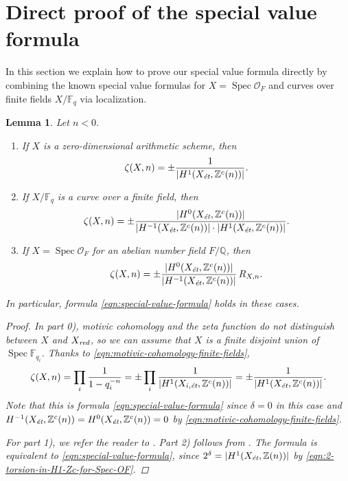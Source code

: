 \documentclass{article}
\DeclareMathOperator{\Spec}{Spec}
\newcommand{\FF}{\mathbb{F}}
\newcommand{\QQ}{\mathbb{Q}}
\newcommand{\ZZ}{\mathbb{Z}}
\newcommand{\et}{\text{\it \'{e}t}}
\newcommand{\red}{\text{\it red}}
\theoremstyle{myplain}
\newtheorem{lemma}[theorem]{Lemma}
\theoremstyle{mydefinition}
\begin{document}

\section{Direct proof of the special value formula}
\label{sec:direct-proof}

In this section we explain how to prove our special value formula directly by
combining the known special value formulas for $X = \Spec \mathcal{O}_F$ and
curves over finite fields $X/\FF_q$ via localization.

\begin{lemma}
  \label{lemma:elementary-proof-1}
  Let $n < 0$.

  \begin{enumerate}
  \item[0)] If $X$ is a zero-dimensional arithmetic scheme, then
    $$\zeta (X,n) = \pm \frac{1}{|H^1 (X_\et, \ZZ^c (n))|}.$$

  \item[1)] If $X/\FF_q$ is a curve over a finite field, then
    \[ \zeta (X,n) =
      \pm\frac{|H^0 (X_\et, \ZZ^c(n))|}{|H^{-1} (X_\et, \ZZ^c(n))|\cdot |H^1 (X_\et, \ZZ^c(n))|}. \]

  \item[2)] If $X = \Spec \mathcal{O}_F$ for an abelian number field $F/\QQ$,
    then
    \[ \zeta (X,n) = \pm\frac{|H^0 (X_\et, \ZZ^c(n))|}{|H^{-1} (X_\et, \ZZ^c(n))|}\,R_{X,n}. \]
  \end{enumerate}

  In particular, formula \eqref{eqn:special-value-formula} holds in these
  cases.

  \begin{proof}
    In part 0), motivic cohomology and the zeta function do not distinguish
    between $X$ and $X_\red$, so we can assume that $X$ is a finite   
    disjoint union of $\Spec \FF_{q_i}$. Thanks to
    \eqref{eqn:motivic-cohomology-finite-fields},
    \[ \zeta (X,n) = \prod_i \frac{1}{1 - q_i^{-n}} =
      \pm \prod_i \frac{1}{|H^1 (X_{i,\et}, \ZZ^c (n))|} =
      \pm \frac{1}{|H^1 (X_\et, \ZZ^c (n))|}. \]
    Note that this is formula \eqref{eqn:special-value-formula}
    since $\delta = 0$ in this case and
    $H^{-1} (X_\et, \ZZ^c (n)) = H^0 (X_\et, \ZZ^c (n)) = 0$ by
    \eqref{eqn:motivic-cohomology-finite-fields}.

    \vspace{1em}

    For part 1), we refer the reader to \cite[\S 5]{Beshenov-Weil-etale-2}.
    Part 2) follows from \cite[Proposition~5.35]{Flach-Morin-2018}.
    The formula is equivalent to \eqref{eqn:special-value-formula}, since
    $2^\delta = |H^1 (X_\et, \ZZ (n))|$ by
    \eqref{eqn:2-torsion-in-H1-Zc-for-Spec-OF}.
  \end{proof}
\end{lemma}
\end{document}
